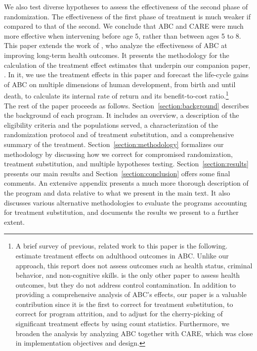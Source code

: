 \noindent We also test diverse hypotheses to assess the effectiveness of the second phase of randomization. The effectiveness of the first phase of treatment is much weaker if compared to that of the second. We conclude that ABC and CARE were much more effective when intervening before age 5, rather than between ages 5 to 8.\\

\noindent This paper extends the work of \citet{Campbell_Conti_etal_2014_EarlyChildhoodInvestments}, who analyze the effectiveness of ABC at improving long-term health outcomes. It presents the methodology for the calculation of the treatment effect estimates that underpin our companion paper, \citet{Elango_et_al_2015_ABC_unpublished}. In it, we use the treatment effects in this paper and forecast the life-cycle gains of ABC on multiple dimensions of human development, from birth and until death, to calculate its internal rate of return and its benefit-to-cost ratio.\footnote{A brief survey of previous, related work to this paper is the following. \cite{Campbell_Pungello_etal_2012_DP} estimate treatment effects on adulthood outcomes in ABC. Unlike our approach, this report does not assess outcomes such as health status, criminal behavior, and non-cognitive skills. \cite{Campbell_Conti_etal_2014_EarlyChildhoodInvestments} is the only other paper to assess health outcomes, but they do not address control contamination. In addition to providing a comprehensive analysis of ABC's effects, our paper is a valuable contribution since it is the first to correct for treatment substitution, to correct for program attrition, and to adjust for the cherry-picking of significant treatment effects by using count statistics. Furthermore, we broaden the analysis by analyzing ABC together with CARE, which was close in implementation objectives and design.}\\

\noindent The rest of the paper proceeds as follows. Section~\ref{section:background} describes the background of each program. It includes an overview, a description of the eligibility criteria and the populations served, a characterization of the randomization protocol and of treatment substitution, and a comprehensive summary of the treatment.  Section~\ref{section:methodology} formalizes our methodology by discussing how we correct for compromised randomization, treatment substitution, and multiple hypotheses testing. Section~\ref{section:results} presents our main results and Section~\ref{section:conclusion} offers some final comments. An extensive appendix presents a much more thorough description of the program and data relative to what we present in the main text. It also discusses various alternative methodologies to evaluate the programs accounting for treatment substitution, and documents the results we present to a further extent.


